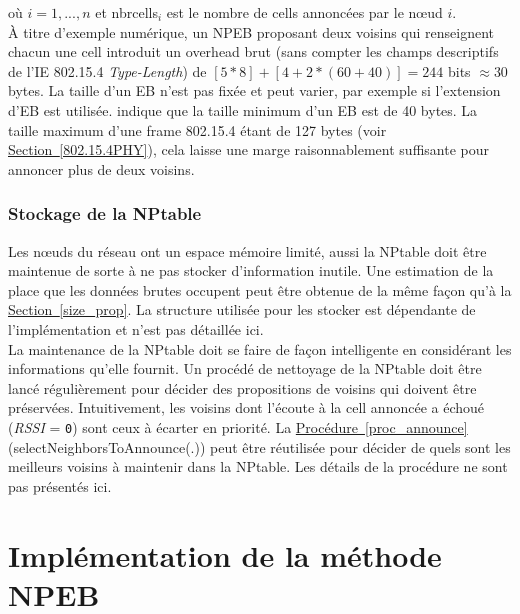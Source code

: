 \documentclass[]{report}
\newcommand{\wordlink}[2]{\hyperref[#2]{#1~\ref{#2}}}
\begin{document}
où $i = 1, ..., n$ et nbrcells$_i$ est le nombre de cells annoncées par le nœud $i$.\\
 
À titre d'exemple numérique, un NPEB proposant deux voisins qui renseignent chacun une cell introduit un overhead brut (sans compter les champs descriptifs de l'IE 802.15.4 \textit{Type-Length}) de $[5*8] + [4+2*(60+40)] = 244$ bits $\approx 30$ bytes. La taille d'un EB n'est pas fixée et peut varier, par exemple si l'extension d'EB \cite{ietf-6tisch-enrollment-enhanced-beacon-14} est utilisée. \cite{ATP} indique que la taille minimum d'un EB est de 40 bytes. La taille maximum d'une frame 802.15.4 étant de 127 bytes (voir \wordlink{Section}{802.15.4PHY}), cela laisse une marge raisonnablement suffisante pour annoncer plus de deux voisins.

\newpage

\subsubsection{Stockage de la NPtable}

Les nœuds du réseau ont un espace mémoire limité, aussi la NPtable doit être maintenue de sorte à ne pas stocker d'information inutile. Une estimation de la place que les données brutes occupent peut être obtenue de la même façon qu'à la \wordlink{Section}{size_prop}. La structure utilisée pour les stocker est dépendante de l'implémentation et n'est pas détaillée ici.\\

La maintenance de la NPtable doit se faire de façon intelligente en considérant les informations qu'elle fournit. Un procédé de nettoyage de la NPtable doit être lancé régulièrement pour décider des propositions de voisins qui doivent être préservées. Intuitivement, les voisins dont l'écoute à la cell annoncée a échoué (\textit{RSSI} = \texttt{0}) sont ceux à écarter en priorité. La \wordlink{Procédure}{proc_announce} (selectNeighborsToAnnounce(.)) peut être réutilisée pour décider de quels sont les meilleurs voisins à maintenir dans la NPtable. Les détails de la procédure ne sont pas présentés ici.


\section{Implémentation de la méthode NPEB}
\label{implem_NPEB}
\end{document}
